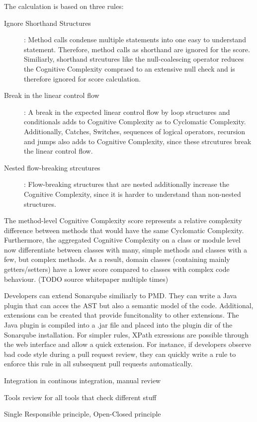 The calculation is based on three rules:
\begin{description}
    \item[Ignore Shorthand Structures]: Method calls condense multiple statements into one easy to understand statement. Therefore, method calls as shorthand are ignored for the score. Similiarly, shorthand strcutures like the null-coalescing operator reduces the Cognitive Complexity compraed to an extensive null check and is therefore ignored for score calculation.
    \item[Break in the linear control flow]: A break in the expected linear control flow by loop structures and conditionals adds to Cognitive Complexity as to Cyclomatic Complexity. Additionally, Catches, Switches, sequences of logical operators, recursion and jumps also adds to Cognitive Complexity, since these strcutures break the linear control flow.
    \item[Nested flow-breaking strcutures]: Flow-breaking structures that are nested additionally increase the Cognitive Complexity, since it is harder to understand than non-nested structures.  
\end{description}
The method-level Cognitive Complexity score represents a relative complexity difference between methods that would have the same Cyclomatic Complexity. Furthermore, the aggregated Cognitive Complexity on a class or module level now differentiate between classes with many, simple methods and classes with a few, but complex methods. As a result, domain classes (containing mainly getters/setters) have a lower score compared to classes with complex code behaviour. (TODO source whitepaper multiple times)


Developers can extend Sonarqube similiarly to PMD. They can write a Java plugin that can acces the AST but also a semantic model of the code. Additional, extensions can be created that provide funcitonality to other extensions. The Java plugin is compiled into a .jar file and placed into the plugin dir of the Sonarqube installation. For simpler rules, XPath exressions are possible through the web interface and allow a quick extension. For instance, if developers observe bad code style during a pull request review, they can quickly write a rule to enforce this rule in all subsequent pull requests automatically.

Integration in continous integration, manual review

Tools review for all tools that check different stuff

Single Responsible principle, Open-Closed principle

